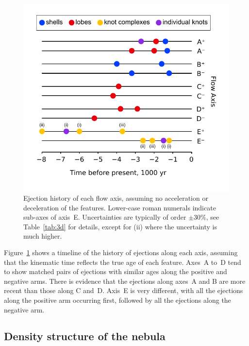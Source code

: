 \documentclass[useAMS, usenatbib]{mnras}
\begin{document}
\begin{figure}
  \includegraphics[width=\linewidth]
  {figs/turtle-flow-axis-history}
  \caption{
    Ejection history of each flow axis,
    assuming no acceleration or deceleration of the features.
    Lower-case roman numerals indicate sub-axes of axis~E.
    Uncertainties are typically of order \(\pm 30\%\),
    see Table~\ref{tab:3d} for details,
    except for (ii) where the uncertainty is much higher.
  }
  \label{fig:axis-history}
\end{figure}

Figure~\ref{fig:axis-history} shows a timeline of the history of ejections along each axis,
assuming that the kinematic time reflects the true age of each feature.
Axes~A to~D tend to show matched pairs of ejections with similar ages along the positive and negative arms.
There is evidence that the ejections along axes~A and B are more recent than those along C and~D.\@
Axis~E is very different, with all the ejections along the positive arm occurring first,
followed by all the ejections along the negative arm.

\subsection{Density structure of the nebula}
\label{sec:density-structure}
\end{document}
